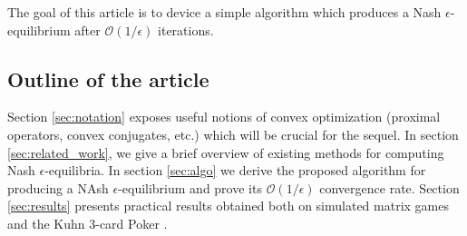 \documentclass[12pt]{article}
\begin{document}
The goal of this article is to device a simple algorithm which produces a Nash $\epsilon$-equilibrium after $\mathcal{O}(1/\epsilon)$ iterations.

\subsection{Outline of the article}
 Section \ref{sec:notation} exposes useful notions of convex optimization (proximal operators, convex conjugates, etc.) which will be crucial for the sequel. In section \ref{sec:related_work}, we give a brief overview of existing methods for computing Nash $\epsilon$-equilibria. In section \ref{sec:algo} we derive the proposed algorithm for producing a NAsh $\epsilon$-equilibrium and prove its $\mathcal{O}(1/\epsilon)$ convergence rate. Section \ref{sec:results} presents practical results obtained both on simulated matrix games and the Kuhn 3-card Poker \cite{kuhn}.



\end{document}
